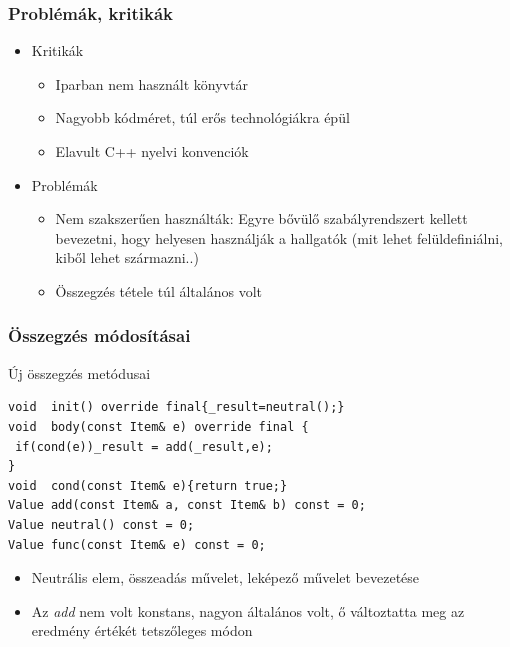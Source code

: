 \documentclass[11pt]{beamer}
\begin{document}
\begin{frame}
	\frametitle{Problémák, kritikák}
	\begin{itemize}
		\item Kritikák
		\begin{itemize}
			\item Iparban nem használt könyvtár
			\item Nagyobb kódméret, túl erős technológiákra épül
			\item Elavult C++ nyelvi konvenciók
		\end{itemize}
		\item Problémák
		\begin{itemize}
			\item Nem szakszerűen használták: Egyre bővülő szabályrendszert kellett  bevezetni, hogy helyesen használják a hallgatók (mit lehet felüldefiniálni, kiből lehet származni..)
			\item Összegzés tétele túl általános volt
		\end{itemize}
	\end{itemize}
\end{frame}

\begin{frame}[fragile]
	\frametitle{Összegzés módosításai}
	\begin{block}{Új összegzés metódusai}
	\begin{lstlisting}[basicstyle=\small]
void  init() override final{_result=neutral();}
void  body(const Item& e) override final {
 if(cond(e))_result = add(_result,e);
}
void  cond(const Item& e){return true;}
Value add(const Item& a, const Item& b) const = 0;
Value neutral() const = 0;
Value func(const Item& e) const = 0;

	\end{lstlisting}
	\end{block}
	
	\begin{itemize}
	\item Neutrális elem, összeadás művelet, leképező művelet bevezetése
	\item Az \textit{add} nem volt konstans, nagyon általános volt, ő változtatta meg az eredmény értékét tetszőleges módon
	\end{itemize}
\end{frame}
\end{document}
